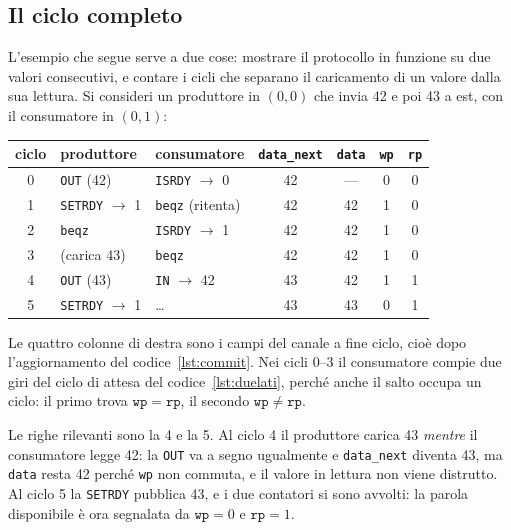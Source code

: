 \subsection{Il ciclo completo}
\label{sec:ciclo-completo}

L'esempio che segue serve a due cose: mostrare il protocollo in funzione su due
valori consecutivi, e contare i cicli che separano il caricamento di un valore
dalla sua lettura. Si consideri un produttore in $(0,0)$ che invia 42 e poi 43
a est, con il consumatore in $(0,1)$:

\begin{center}
\begin{tabular}{cllcccc}
    \toprule
    ciclo & produttore & consumatore & \texttt{data\_next} & \texttt{data} & \texttt{wp} & \texttt{rp} \\
    \midrule
    0 & \texttt{OUT} (42)  & \texttt{ISRDY} $\rightarrow$ 0  & 42 & --- & 0 & 0 \\
    1 & \texttt{SETRDY} $\rightarrow$ 1 & \texttt{beqz} (ritenta) & 42 & 42 & 1 & 0 \\
    2 & \texttt{beqz} & \texttt{ISRDY} $\rightarrow$ 1 & 42 & 42 & 1 & 0 \\
    3 & (carica 43) & \texttt{beqz} & 42 & 42 & 1 & 0 \\
    4 & \texttt{OUT} (43)  & \texttt{IN} $\rightarrow$ 42 & 43 & 42 & 1 & 1 \\
    5 & \texttt{SETRDY} $\rightarrow$ 1 & \dots & 43 & 43 & 0 & 1 \\
    \bottomrule
\end{tabular}
\end{center}

Le quattro colonne di destra sono i campi del canale a fine ciclo, cioè dopo
l'aggiornamento del codice~\ref{lst:commit}. Nei cicli 0--3 il consumatore
compie due giri del ciclo di attesa del codice~\ref{lst:duelati}, perché anche
il salto occupa un ciclo: il primo trova $\mathtt{wp} = \mathtt{rp}$, il
secondo $\mathtt{wp} \neq \mathtt{rp}$.

Le righe rilevanti sono la 4 e la 5. Al ciclo 4 il produttore carica 43
\emph{mentre} il consumatore legge 42: la \texttt{OUT} va a segno ugualmente e
\texttt{data\_next} diventa 43, ma \texttt{data} resta 42 perché \texttt{wp} non
commuta, e il valore in lettura non viene distrutto. Al ciclo 5 la
\texttt{SETRDY} pubblica 43, e i due contatori si sono avvolti: la parola
disponibile è ora segnalata da $\mathtt{wp} = 0$ e $\mathtt{rp} = 1$.

\clearpage
